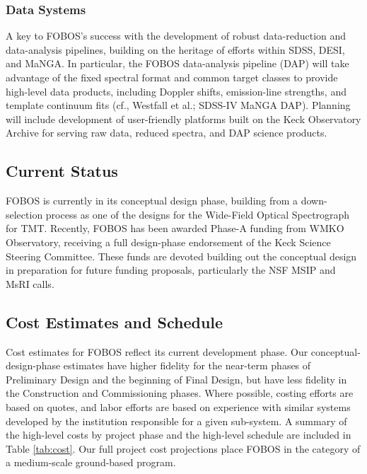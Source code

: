 \subsubsection{Data Systems} A key to FOBOS's success with the
development of robust data-reduction and data-analysis pipelines,
building on the heritage of efforts within SDSS, DESI, and MaNGA. In
particular, the FOBOS data-analysis pipeline (DAP) will take
advantage of the fixed spectral format and common target classes to
provide high-level data products, including Doppler shifts,
emission-line strengths, and template continuum fits (cf., Westfall
et al.; SDSS-IV MaNGA DAP). Planning will include development of
user-friendly platforms built on the Keck Observatory Archive for
serving raw data, reduced spectra, and DAP science products.


\subsection{Current Status} FOBOS is currently in its conceptual design
phase, building from a down-selection process as one of the designs for
the Wide-Field Optical Spectrograph for TMT. Recently, FOBOS has been
awarded Phase-A funding from WMKO Observatory, receiving a full
design-phase endorsement of the Keck Science Steering Committee. These
funds are devoted building out the conceptual design in preparation for
future funding proposals, particularly the NSF MSIP and MsRI calls.

\subsection{Cost Estimates and Schedule}

Cost estimates for FOBOS reflect its current development phase.  Our
conceptual-design-phase estimates have higher fidelity for the near-term
phases of Preliminary Design and the beginning of Final Design, but have
less fidelity in the Construction and Commissioning phases.  Where
possible, costing efforts are based on quotes, and labor efforts are
based on experience with similar systems developed by the institution
responsible for a given sub-system.  A summary of the high-level costs
by project phase and the high-level schedule are included in Table
\ref{tab:cost}.  Our full project cost projections place FOBOS in the
category of a medium-scale ground-based program. %

